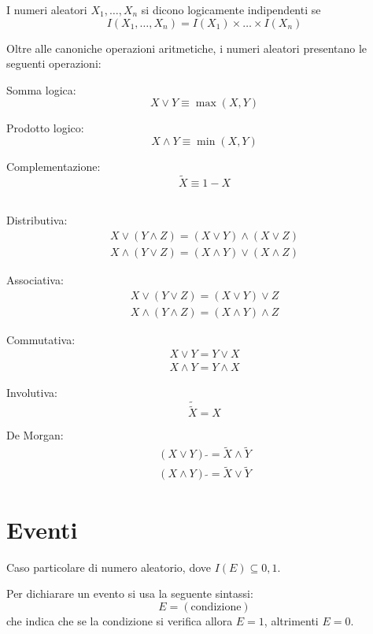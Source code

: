 \begin{definition}
  I numeri aleatori $X_1, \ldots, X_n$ si dicono logicamente indipendenti se
  \[ I(X_1, \ldots, X_n) = I(X_1) \times \ldots \times I(X_n) \]
\end{definition}

\begin{definition}
  Oltre alle canoniche operazioni aritmetiche, i numeri aleatori presentano le seguenti operazioni:

  Somma logica:
  \[ X \vee Y \equiv \max(X,Y) \]

  Prodotto logico:
  \[ X \wedge Y \equiv \min(X,Y) \]

  Complementazione:
  \[ \tilde{X} \equiv 1 - X \]
\end{definition}

\begin{definition}{\ \\} %
  Distributiva:
  \begin{align*}
    X \vee (Y \wedge Z) = (X \vee Y) \wedge (X \vee Z) \\
    X \wedge (Y \vee Z) = (X \wedge Y) \vee (X \wedge Z)
  \end{align*}

  Associativa:
  \begin{align*}
    X \vee (Y \vee Z) = (X \vee Y) \vee Z \\
    X \wedge (Y \wedge Z) = (X \wedge Y) \wedge Z
  \end{align*}

  Commutativa:
  \begin{align*}
    X \vee Y = Y \vee X \\
    X \wedge Y = Y \wedge X
  \end{align*}

  Involutiva:
  \[ \tilde{\tilde{X}} = X \]

  De Morgan:
  \begin{align*}
    (X \vee Y) \; \tilde{} = \tilde{X} \wedge \tilde{Y} \\
    (X \wedge Y) \; \tilde{} = \tilde{X} \vee \tilde{Y}
  \end{align*}
\end{definition}

\section{Eventi}
\begin{definition}[Evento]\label{def:evento}
  Caso particolare di numero aleatorio, dove \( I(E) \subseteq {0,1} \).
\end{definition}
Per dichiarare un evento si usa la seguente sintassi:
\[ E = (\text{condizione}) \]
che indica che se la condizione si verifica allora \( E = 1 \), altrimenti \( E = 0 \).

